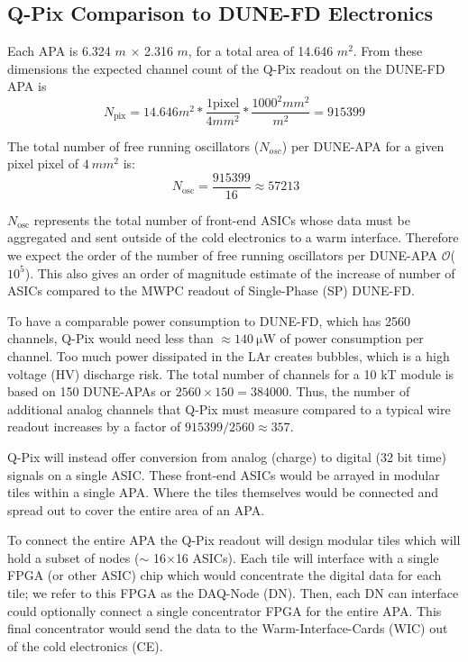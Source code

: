 \subsection{Q-Pix Comparison to DUNE-FD Electronics}
Each APA is 6.324 $\unit{m}$ $\times$ 2.316 $\unit{m}$, for a total area of 14.646 $\unit{m^{2}}$.
From these dimensions the expected channel count of the Q-Pix readout on the DUNE-FD APA is
\begin{equation}
  N_{\mathrm{pix}} = 14.646 m^{2} * \frac{1 \mathrm{pixel}}{4 mm^{2}} * \frac{ 1000^{2} mm^{2} }{m^{2}} = 915399
\end{equation}

The total number of free running oscillators ($N_{osc}$) per DUNE-APA for a given pixel pixel of $4~mm^{2}$ is:
\begin{equation}~\label{eq:nosc}
N_{\mathrm{osc}} = \frac{915399}{16} \approx 57213
\end{equation}

$N_{\mathrm{osc}}$ represents the total number of front-end ASICs whose data must be aggregated and sent outside of the cold electronics to a warm interface.
Therefore we expect the order of the number of free running oscillators per DUNE-APA $\mathcal{O}$($10^5$).
This also gives an order of magnitude estimate of the increase of number of ASICs compared to the MWPC readout of Single-Phase (SP) DUNE-FD.

To have a comparable power consumption to DUNE-FD, which has 2560 channels, Q-Pix would need less than $\approx 140~\mathrm{\mu W}$ of power consumption per channel.
Too much power dissipated in the LAr creates bubbles, which is a high voltage (HV) discharge risk.
The total number of channels for a 10 kT module is based on 150 DUNE-APAs or $2560\times 150 = 384000$.
Thus, the number of additional analog channels that Q-Pix must measure compared to a typical wire readout increases by a factor of $915399 / 2560 \approx 357$.

Q-Pix will instead offer conversion from analog (charge) to digital (32 bit time) signals on a single ASIC.
These front-end ASICs would be arrayed in modular tiles within a single APA.
Where the tiles themselves would be connected and spread out to cover the entire area of an APA.

To connect the entire APA the Q-Pix readout will design modular tiles which will hold a subset of nodes ($\sim$ 16$\times$16 ASICs).
Each tile will interface with a single FPGA (or other ASIC) chip which would concentrate the digital data for each tile; we refer to this FPGA as the DAQ-Node (DN).
Then, each DN can interface could optionally connect a single concentrator FPGA for the entire APA.
This final concentrator would send the data to the Warm-Interface-Cards (WIC) out of the cold electronics (CE).

